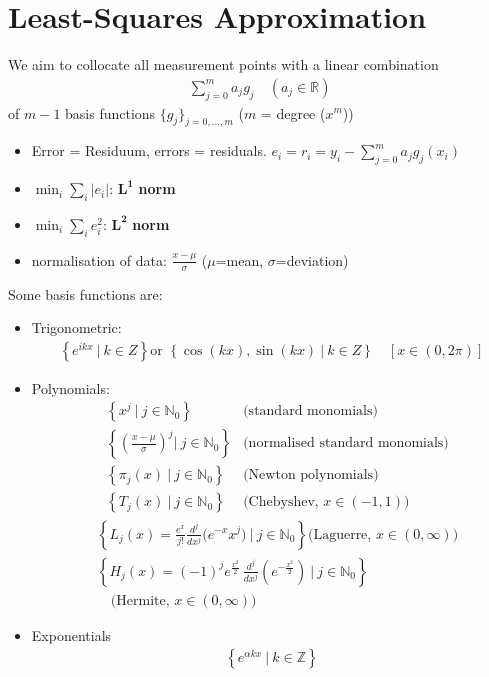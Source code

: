 \section{Least-Squares Approximation}

We aim to collocate all measurement points with a linear combination
\begin{align*}
    \sum_{j=0}^m a_jg_j\quad (a_j\in\mathbb{R})
\end{align*}
of $m-1$ basis functions $\{g_j\}_{j=0,\ldots,m}$ ($m$ = degree ($x^m$))

\begin{itemize}
    \item Error = Residuum, errors = residuals. $e_i=r_i=y_i - \sum_{j=0}^ma_jg_j(x_i)$
    \item $\min_i\sum_i|e_i|$: $\mathbf{L^1}$ \textbf{norm}
    \item $\min_i\sum_ie_i^2$: $\mathbf{L^2}$ \textbf{norm}
    \item normalisation of data: $\frac{x-\mu}{\sigma}$ ($\mu$=mean, $\sigma$=deviation)
\end{itemize}

Some basis functions are:
\begin{itemize}
    \item{
        Trigonometric:
        \begin{align*}
            \left\{e^{i k x}\ |\ k\in Z\right\}{\text{or }}\left\{{\cos(k x){\mathrm{,}}\sin(k x)\ |\ k\in Z}\right\}\quad[x\in(0,2\pi)]
        \end{align*}
    }
    \item{
        Polynomials:
        \begin{align*}
            & \left\{x^{j}\ |\ j\in \mathbb{N}_{0}\right\} & \text{(standard monomials)} \\
            & \left\{\left({\frac{x-\mu}{\sigma}}\right)^{j}|\ j\in \mathbb{N}_{0}\right\} & \text{(normalised standard monomials)} \\
            & \left\{ \pi_{j}(x)\ |\ j\in \mathbb{N}_{0} \right\} & \text{(Newton polynomials)} \\
            & \left\{T_{j}(x)\ |\ j\in \mathbb{N}_{0}\right\} & \text{(Chebyshev, }x\in(-1,1))
        \end{align*}
        \begin{align*}
            & \left\{L_{j}(x)=\frac{e^{x}}{j!}\frac{d^{j}}{d x^{j}}\Big(e^{-x}x^{j}\Big)\ |\ j\in \mathbb{N}_{0}\right\}
            \text{(Laguerre, }x\in(0,\infty)) \\
            & \left\{H_{j}(x)=(-1)^{j}e^{\frac{x^{2}}{2}}\,{\frac{d^{j}}{d x^{j}}}\left(e^{-\frac{x^{2}}{2}}\right)\ |\ j\in \mathbb{N}_{0}\right\} \\
            &\quad\text{(Hermite, }x\in(0,\infty))
        \end{align*}
    }
    \item{
        Exponentials
        \begin{align*}
            \left\{ e^{\alpha kx}\ |\ k\in\mathbb{Z} \right\}
        \end{align*}
    }
\end{itemize}

